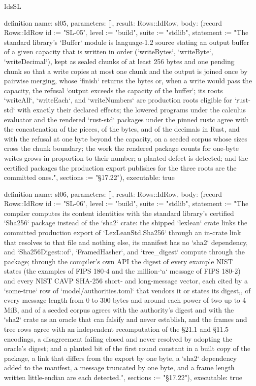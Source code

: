 \begin{lexlean}{IdsSL}
\begin{semanticmodule}
definition{
  name: sl05,
  parameters: [],
  result: Rows::IdRow,
  body: (record Rows::IdRow {id := "SL-05", level := "build", suite := "stdlib", statement := "The standard library's `Buffer` module is language-1.2 source stating an output buffer of a given capacity that is written in order (`writeBytes`, `writeByte`, `writeDecimal`), kept as sealed chunks of at least 256 bytes and one pending chunk so that a write copies at most one chunk and the output is joined once by pairwise merging, whose `finish` returns the bytes or, when a write would pass the capacity, the refusal `output exceeds the capacity of the buffer`; its roots `writeAll`, `writeEach`, and `writeNumbers` are production roots eligible for `rust-std` with exactly their declared effects; the lowered programs under the calculus evaluator and the rendered `rust-std` packages under the pinned rustc agree with the concatenation of the pieces, of the bytes, and of the decimals in Rust, and with the refusal at one byte beyond the capacity, on a seeded corpus whose sizes cross the chunk boundary; the work the rendered package counts for one-byte writes grows in proportion to their number; a planted defect is detected; and the certified packages the production export publishes for the three roots are the committed ones.", sections := "§17.22"}),
  executable: true
}

definition{
  name: sl06,
  parameters: [],
  result: Rows::IdRow,
  body: (record Rows::IdRow {id := "SL-06", level := "build", suite := "stdlib", statement := "The compiler computes its content identities with the standard library's certified `Sha256` package instead of the `sha2` crate: the shipped `lexlean` crate links the committed production export of `LexLeanStd.Sha256` through an in-crate link that resolves to that file and nothing else, its manifest has no `sha2` dependency, and `Sha256Digest::of`, `FramedHasher`, and `tree_digest` compute through the package; through the compiler's own API the digest of every example NIST states (the examples of FIPS 180-4 and the million-`a` message of FIPS 180-2) and every NIST CAVP SHA-256 short- and long-message vector, each cited by a `some-true` row of `model/authorities.toml` that vendors it or states its digest,, of every message length from 0 to 300 bytes and around each power of two up to 4 MiB, and of a seeded corpus agrees with the authority's digest and with the `sha2` crate as an oracle that can falsify and never establish, and the frames and tree rows agree with an independent recomputation of the §21.1 and §11.5 encodings, a disagreement failing closed and never resolved by adopting the oracle's digest; and a planted bit of the first round constant in a built copy of the package, a link that differs from the export by one byte, a `sha2` dependency added to the manifest, a message truncated by one byte, and a frame length written little-endian are each detected.", sections := "§17.22"}),
  executable: true
}


\end{semanticmodule}
\end{lexlean}

